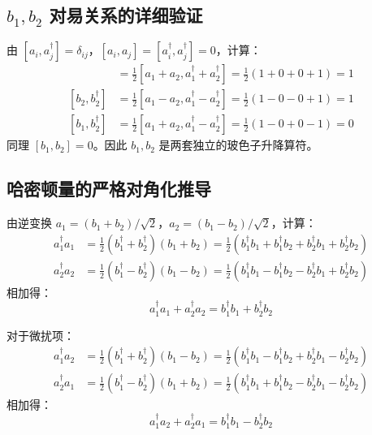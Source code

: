
\subsection[b1, b2 对易关系的详细验证]{$b_1, b_2$ 对易关系的详细验证}

由 $[a_i, a_j^\dagger] = \delta_{ij}$，$[a_i, a_j] = [a_i^\dagger, a_j^\dagger] = 0$，计算：
\begin{align*}
[b_1, b_1^\dagger] &= \frac{1}{2}[a_1+a_2, a_1^\dagger+a_2^\dagger] = \frac{1}{2}(1+0+0+1) = 1 \\
[b_2, b_2^\dagger] &= \frac{1}{2}[a_1-a_2, a_1^\dagger-a_2^\dagger] = \frac{1}{2}(1-0-0+1) = 1 \\
[b_1, b_2^\dagger] &= \frac{1}{2}[a_1+a_2, a_1^\dagger-a_2^\dagger] = \frac{1}{2}(1-0+0-1) = 0
\end{align*}
同理 $[b_1, b_2] = 0$。因此 $b_1, b_2$ 是两套独立的玻色子升降算符。

\subsection{哈密顿量的严格对角化推导}

由逆变换 $a_1 = (b_1+b_2)/\sqrt{2}$，$a_2 = (b_1-b_2)/\sqrt{2}$，计算：
\begin{align*}
a_1^\dagger a_1 &= \frac{1}{2}(b_1^\dagger + b_2^\dagger)(b_1 + b_2) = \frac{1}{2}(b_1^\dagger b_1 + b_1^\dagger b_2 + b_2^\dagger b_1 + b_2^\dagger b_2) \\
a_2^\dagger a_2 &= \frac{1}{2}(b_1^\dagger - b_2^\dagger)(b_1 - b_2) = \frac{1}{2}(b_1^\dagger b_1 - b_1^\dagger b_2 - b_2^\dagger b_1 + b_2^\dagger b_2)
\end{align*}
相加得：
\[
a_1^\dagger a_1 + a_2^\dagger a_2 = b_1^\dagger b_1 + b_2^\dagger b_2
\]

对于微扰项：
\begin{align*}
a_1^\dagger a_2 &= \frac{1}{2}(b_1^\dagger + b_2^\dagger)(b_1 - b_2) = \frac{1}{2}(b_1^\dagger b_1 - b_1^\dagger b_2 + b_2^\dagger b_1 - b_2^\dagger b_2) \\
a_2^\dagger a_1 &= \frac{1}{2}(b_1^\dagger - b_2^\dagger)(b_1 + b_2) = \frac{1}{2}(b_1^\dagger b_1 + b_1^\dagger b_2 - b_2^\dagger b_1 - b_2^\dagger b_2)
\end{align*}
相加得：
\[
a_1^\dagger a_2 + a_2^\dagger a_1 = b_1^\dagger b_1 - b_2^\dagger b_2
\]

